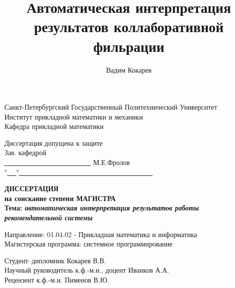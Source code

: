 \documentclass[12pt,a4paper]{report}
\author{Вадим Кокарев}
\title{Автоматическая интерпретация результатов коллаборативной фильрации}
\begin{document}
\begin{titlepage}
\par

\begin{center}
{\large
Санкт-Петербургский Государственный Политехнический Университет\\
Институт прикладной математики и механики\\
Кафедра прикладной математики\\

\vspace*{0.5cm}

\begin{flushright}
Диссертация допущена к защите\\
Зав. кафедрой\ \ \ \ \ \ \ \ \ \ \ \ \ \ \ \ \ \ \ \ \ \ \ \ \ \ \ \\
\underline{ \ \ \ \ \ \ \ \ \ \ \ \ \ \ \ \ \ \ \ \ \ \ \ \ \ } М.Е.Фролов\\
"\underline{ \ \ }"\underline{ \ \ \ \ \ \ \ \ \ \ \ \ \ \ \ \ \ \ \ \ \ \ \ \ \ \ \ \ \ \ \ \ \ \ \ \ \ \ }
\end{flushright}

\vspace*{2.0cm}

{\Large
  \textbf{
    ДИССЕРТАЦИЯ\\
    на соискание степени МАГИСТРА\\
  }
}
\vspace*{1cm}
\textbf{
  Тема: \emph{автоматическая интерпретация результатов работы рекомендательной системы}\\
}

}

\vspace*{1cm}

\begin{flushleft}
Направление: 01.04.02 - Прикладная математика и информатика\\
Магистерская программа: системное программирование\\
\end{flushleft}

\vspace*{0.2cm}

\begin{flushleft}
Студент--дипломник \hrulefill Кокарев В.В.\\
\vspace*{0.3cm}
Научный руководитель к.ф.-м.н., доцент \hrulefill Иванков А.А.\\
\vspace*{0.3cm}
Рецензент к.ф.-м.н. \hrulefill Пименов В.Ю.\\
\vspace*{0.3cm}
\end{flushleft}
\vspace{0.2em} 


\end{center}
\end{titlepage}
\end{document}
